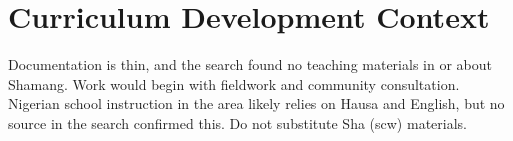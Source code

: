 \documentclass[12pt]{article}
\begin{document}
\section{Curriculum Development Context}
Documentation is thin, and the search found no teaching materials in or about Shamang. Work would begin with fieldwork and community consultation. Nigerian school instruction in the area likely relies on Hausa and English, but no source in the search confirmed this. Do not substitute Sha (scw) materials.
\end{document}
